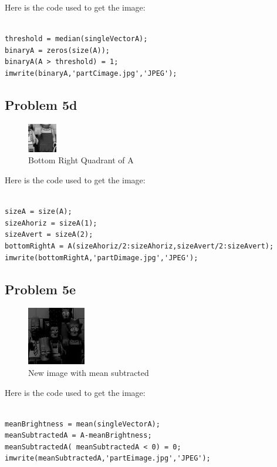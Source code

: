 \documentclass[11pt,psfig]{article}
\begin{document}
Here is the code used to get the image:

\begin{verbatim}

threshold = median(singleVectorA);
binaryA = zeros(size(A));
binaryA(A > threshold) = 1;
imwrite(binaryA,'partCimage.jpg','JPEG');

\end{verbatim}

\subsection*{Problem 5d}

\begin{figure}[H]
\centering
\includegraphics[height=0.5in]{partDimage.jpg}
\caption{Bottom Right Quadrant of A}
\end{figure}

Here is the code used to get the image:

\begin{verbatim}

sizeA = size(A);
sizeAhoriz = sizeA(1);
sizeAvert = sizeA(2);
bottomRightA = A(sizeAhoriz/2:sizeAhoriz,sizeAvert/2:sizeAvert);
imwrite(bottomRightA,'partDimage.jpg','JPEG');

\end{verbatim}

\subsection*{Problem 5e}

\begin{figure}[H]
\centering
\includegraphics[height=1in]{partEimage.jpg}
\caption{New image with mean subtracted}
\end{figure}

Here is the code used to get the image:

\begin{verbatim}

meanBrightness = mean(singleVectorA);
meanSubtractedA = A-meanBrightness;
meanSubtractedA( meanSubtractedA < 0) = 0;
imwrite(meanSubtractedA,'partEimage.jpg','JPEG');

\end{verbatim}
\end{document}
